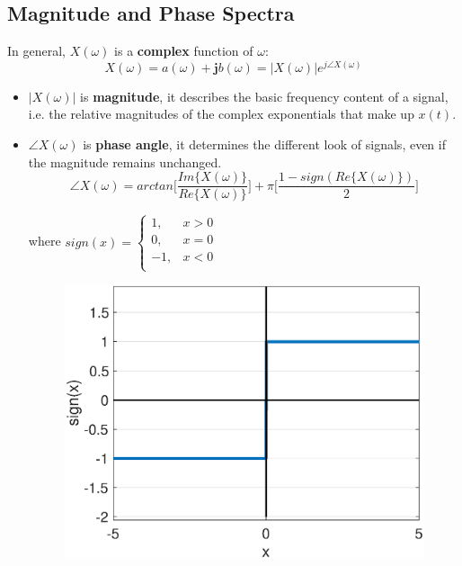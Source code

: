 \documentclass[12pt,a4paper]{article}
\begin{document}
\subsection{Magnitude and Phase Spectra}
In general, $X(\omega)$ is a \textbf{complex} function of $\omega$:
\[ X(\omega)= a(\omega)+\mathbf{j}b(\omega) = \lvert X(\omega) \rvert e^{j\angle X(\omega)}\]
\begin{itemize}
\item $\lvert X(\omega) \rvert$ is \textbf{magnitude}, it describes the basic frequency content of a signal, i.e.  the relative magnitudes of the complex exponentials that make up $x(t)$.
\item $\angle X(\omega)$ is \textbf{phase angle}, it  determines the different look of signals, even if the magnitude remains unchanged.
\[ \angle X(\omega) = arctan\bigg[\frac{Im\{X(\omega)\}}{Re\{X(\omega)\}}\bigg]+\pi \bigg[ \frac{1-sign(Re\{X(\omega)\})}{2} \bigg] \]
\begin{minipage}{0.4\textwidth}
where $sign(x)=\begin{cases}
1, & x>0\\
0, & x=0\\
-1, & x<0\\
\end{cases}$
\end{minipage}
\begin{minipage}{0.4\textwidth}
\begin{figure}[H] \centering
\includegraphics[width=\textwidth]{images/sign.eps}
\end{figure}\end{minipage}
\end{itemize}
\end{document}
